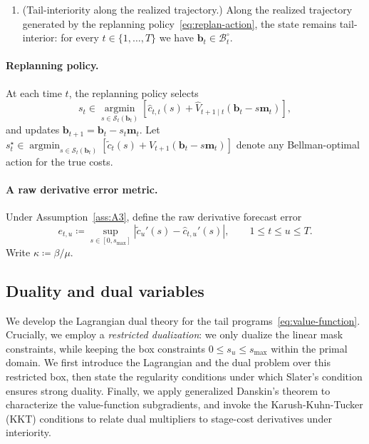 \documentclass[11pt]{article}
\newenvironment{assumptions}{%
  \begingroup
  \renewcommand{\labelenumi}{\textbf{A\arabic{enumi}}.}%
  \renewcommand{\theenumi}{A\arabic{enumi}}%
  \begin{enumerate}
    }{%
  \end{enumerate}
  \endgroup
}
\newcommand{\1}{\mathbf{1}}
\newcommand{\eqdef}{\coloneqq}
\newcommand{\scalt}{\mathcal{S}_{t}}
\newcommand{\bcal}{\mathcal{B}}
\newcommand{\argmin}{\operatorname*{argmin}}
\begin{document}
\begin{assumptions}
  For the average-error bound in Section~\ref{sec:all-ones-mask}, we additionally assume a \emph{pathwise interiority} condition:
  along the realized trajectory, the optimal tail allocations are strictly interior, satisfying $s_u^{\star}(b_{t+1}) \in (0, s_{\max})$ and $\hat{s}_u(b_{t+1}) \in (0, s_{\max})$ for all $u \in \{t+1,\dots,T\}$.
  This naturally holds if the costs are sufficiently homogeneous such that the budget is strictly spread across all available tail stages.
\item\label{ass:A5} (Tail-interiority along the realized trajectory.)
  Along the realized trajectory generated by the replanning policy~\eqref{eq:replan-action}, the state remains tail-interior: for every $t \in \{1,\dots,T\}$ we have $\mathbf{b}_t \in \bcal_t^\circ$.
\end{assumptions}

\paragraph{Replanning policy.}
At each time $t$, the replanning policy selects
\begin{equation}
  \label{eq:replan-action}
  s_t \in \argmin_{s \in \scalt(\mathbf{b}_t)}
  \left[\hat{c}_{t,t}(s) + \hat{V}_{t+1 \mid t}(\mathbf{b}_t - s \mathbf{m}_t)\right],
\end{equation}
and updates $\mathbf{b}_{t+1} = \mathbf{b}_t - s_t \mathbf{m}_t$.
Let $s_t^{\star} \in \argmin_{s \in \scalt(\mathbf{b}_t)} [\tilde{c}_t(s) + V_{t+1}(\mathbf{b}_t - s \mathbf{m}_t)]$ denote any Bellman-optimal action for the true costs.

\paragraph{A raw derivative error metric.}
Under Assumption~\ref{ass:A3}, define the raw derivative forecast error
\begin{equation}
  \label{eq:raw-error}
  e_{t,u} \eqdef \sup_{s \in [0,s_{\max}]} |\tilde{c}_u'(s) - \hat{c}_{t,u}'(s)|,
  \qquad 1 \leq t \leq u \leq T.
\end{equation}
Write $\kappa \eqdef \beta/\mu$.

\subsection{Duality and dual variables}
\label{subsec:duality}

We develop the Lagrangian dual theory for the tail programs~\eqref{eq:value-function}.
Crucially, we employ a \emph{restricted dualization}: we only dualize the linear mask constraints, while keeping the box constraints $0 \leq s_u \leq s_{\max}$ within the primal domain.
We first introduce the Lagrangian and the dual problem over this restricted box, then state the regularity conditions under which Slater's condition ensures strong duality.
Finally, we apply generalized Danskin's theorem to characterize the value-function subgradients, and invoke the Karush-Kuhn-Tucker (KKT) conditions to relate dual multipliers to stage-cost derivatives under interiority.
\end{document}
